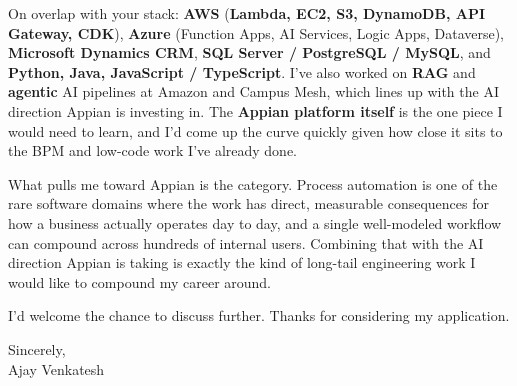 \documentclass[letterpaper,11pt]{article}
\begin{document}
On overlap with your stack: \textbf{AWS} (\textbf{Lambda, EC2, S3, DynamoDB, API Gateway, CDK}), \textbf{Azure} (Function Apps, AI Services, Logic Apps, Dataverse), \textbf{Microsoft Dynamics CRM}, \textbf{SQL Server / PostgreSQL / MySQL}, and \textbf{Python, Java, JavaScript / TypeScript}. I've also worked on \textbf{RAG} and \textbf{agentic} AI pipelines at Amazon and Campus Mesh, which lines up with the AI direction Appian is investing in. The \textbf{Appian platform itself} is the one piece I would need to learn, and I'd come up the curve quickly given how close it sits to the BPM and low-code work I've already done.

What pulls me toward Appian is the category. Process automation is one of the rare software domains where the work has direct, measurable consequences for how a business actually operates day to day, and a single well-modeled workflow can compound across hundreds of internal users. Combining that with the AI direction Appian is taking is exactly the kind of long-tail engineering work I would like to compound my career around.

I'd welcome the chance to discuss further. Thanks for considering my application.

\vspace{12pt}
Sincerely, \\
Ajay Venkatesh
\end{document}
